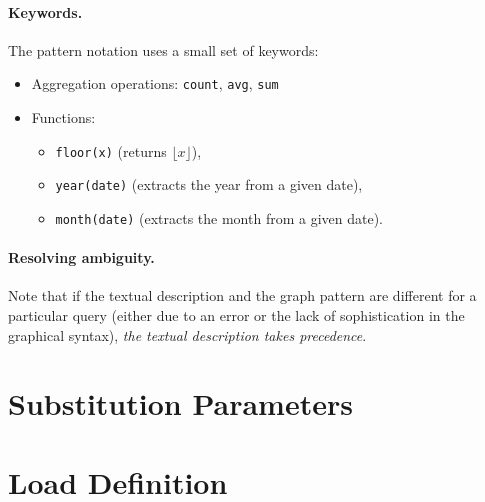 \newcommand{\tuple}[1]{\langle #1 \rangle}

\paragraph{Keywords.} The pattern notation uses a small set of keywords:

\begin{itemize}
	\item Aggregation operations: \lstinline{count}, \lstinline{avg}, \lstinline{sum}
	\item Functions:
	\begin{itemize}
		\item \lstinline{floor(x)} (returns $\lfloor x \rfloor$),
		\item \lstinline{year(date)} (extracts the year from a given date),
		\item \lstinline{month(date)} (extracts the month from a given date).
	\end{itemize}
\end{itemize}

\paragraph{Resolving ambiguity.} Note that if the textual description and the graph pattern are different for a particular query (either due to an error or the lack of sophistication in the graphical syntax), \emph{the textual description takes precedence}.


\section{Substitution Parameters}




\section{Load Definition}


